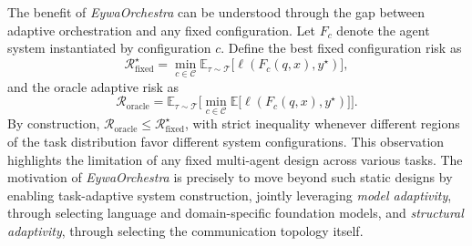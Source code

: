 The benefit of \textit{EywaOrchestra} can be understood through the gap between adaptive orchestration and any fixed configuration. Let $F_c$ denote the agent system instantiated by configuration $c$. Define the best fixed configuration risk as
\begin{equation}
\mathcal{R}_{\mathrm{fixed}}^\star
=
\min_{c\in\mathcal{C}}
\mathbb{E}_{\tau\sim\mathcal{T}}
\big[\ell(F_c(q,x),y^\star)\big],
\end{equation}
and the oracle adaptive risk as
\begin{equation}
\mathcal{R}_{\mathrm{oracle}}
=
\mathbb{E}_{\tau\sim\mathcal{T}}
\Big[
\min_{c\in\mathcal{C}}
\mathbb{E}\big[\ell(F_c(q,x),y^\star)\big]
\Big].
\end{equation}
By construction, $\mathcal{R}_{\mathrm{oracle}} \le \mathcal{R}_{\mathrm{fixed}}^\star$, with strict inequality whenever different regions of the task distribution favor different system configurations. This observation highlights the limitation of any fixed multi-agent design across various tasks. The motivation of \textit{EywaOrchestra} is precisely to move beyond such static designs by enabling task-adaptive system construction, jointly leveraging \emph{model adaptivity}, through selecting language and domain-specific foundation models, and \emph{structural adaptivity}, through selecting the communication topology itself.